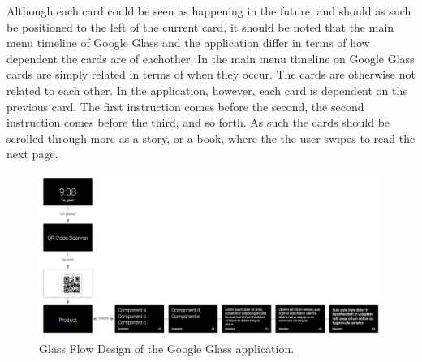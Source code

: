 Although each card could be seen as happening in the future, and should as such be positioned to the left of the current card, it should be noted that the main menu timeline of Google Glass and the application differ in terms of how dependent the cards are of eachother. In the main menu timeline on Google Glass cards are simply related in terms of when they occur. The cards are otherwise not related to each other. In the application, however, each card is dependent on the previous card. The first instruction comes before the second, the second instruction comes before the third, and so forth. As such the cards should be scrolled through more as a story, or a book, where the the user swipes to read the next page.

	\begin{figure}[ht!]
		\centering
		\includegraphics[width=150mm]{images/glaswareFlowDesignerScreenshot}
		\caption{Glass Flow Design of the Google Glass application.}
		\label{glassFlowDesign}
	\end{figure}